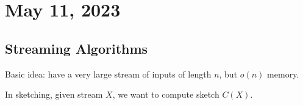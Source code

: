 \section{May 11, 2023}

\subsection{Streaming Algorithms}

Basic idea: have a very large stream of inputs of length $n$, but $o(n)$ memory. 

In \ac{sketching}, given stream $X$, we want to compute sketch $C(X)$. 